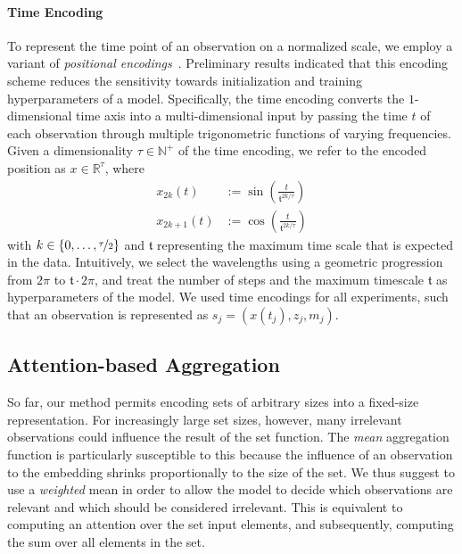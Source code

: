 \documentclass{article}
\renewcommand{\natural}{\mathds{N}\xspace}
\newcommand{\real}     {\mathds{R}\xspace}
\begin{document}
\paragraph{Time Encoding}
To represent the time point of an observation on a normalized scale,
we employ a variant of \emph{positional encodings}~\citep{vaswani2017attention}.
Preliminary results indicated that this encoding scheme reduces the
sensitivity towards initialization and training hyperparameters of
a model.
Specifically, the time encoding converts the \mbox{$1$-dimensional} time
axis into a multi-dimensional input by passing the time $t$ of each
observation through multiple trigonometric functions of varying
frequencies.
Given a dimensionality $\tau \in \natural^{+}$ of the time encoding, we
refer to the encoded position as $x \in \real^{\tau}$, where
\begin{align}
  x_{2k}(t)   &:= \sin\left( \frac{t}{\mathfrak{t}^{2k / \tau}} \right)\\
  x_{2k+1}(t) &:= \cos\left( \frac{t}{\mathfrak{t}^{2k / \tau}} \right)
\end{align}
with $k \in \{0, \dots, \nicefrac{\tau}{2} \}$ and $\mathfrak{t}$
representing the maximum time scale that is expected in the
data.
Intuitively, we select the wavelengths using a geometric
progression from $2\pi$ to $\mathfrak{t} \cdot 2\pi$, and treat the
number of steps and the maximum timescale $\mathfrak{t}$ as
hyperparameters of the model.  We used time encodings for all
experiments, such that an observation is represented as $s_j
= \left(x\left(t_j\right), z_j, m_j \right)$.

\subsection{Attention-based Aggregation}\label{sec:attention}


So far, our method permits encoding sets of arbitrary sizes into
a fixed-size representation. For increasingly large set sizes, however,
many irrelevant observations could influence the result of the set
function. The \emph{mean} aggregation function is particularly
susceptible to this because the influence of an observation to the
embedding shrinks proportionally to the size of the set.
We thus suggest to use a \emph{weighted} mean in order to allow the
model to decide which observations are relevant and which should be
considered irrelevant. This is equivalent to computing an attention
over the set input elements, and
subsequently, computing the sum over all elements in the set.
\end{document}
